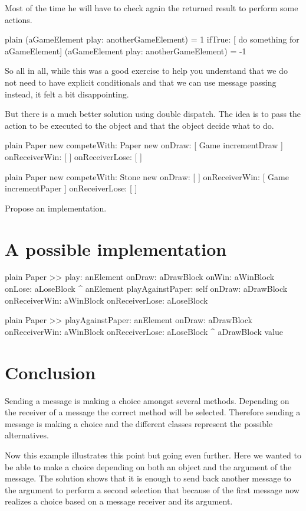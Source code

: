 \documentclass[10pt,twoside,english]{_support/latex/sbabook/sbabook}
\begin{document}
Most of the time he will have to check again the returned result to perform some actions.

\begin{displaycode}{plain}
(aGameElement play: anotherGameElement) = 1 
	ifTrue: [ do something for aGameElement]
	(aGameElement play: anotherGameElement) = -1 
\end{displaycode}

So all in all, while this was a good exercise to help you understand that we do not need to have explicit conditionals and that we can use message passing instead, it felt a bit disappointing. 

But there is a much better solution using double dispatch. The idea is to pass the action to be executed to the object and that the object decide what to do. 

\begin{displaycode}{plain}
Paper new competeWith: Paper new
	onDraw: [ Game incrementDraw ]
	onReceiverWin: [ ]
	onReceiverLose: [ ]
\end{displaycode}

\begin{displaycode}{plain}
Paper new competeWith: Stone new
	onDraw: [ ]
	onReceiverWin: [ Game incrementPaper ]
	onReceiverLose: [ ]
\end{displaycode}

Propose an implementation.
\section{A possible implementation}
\begin{displaycode}{plain}
Paper >> play: anElement onDraw: aDrawBlock onWin: aWinBlock onLose: aLoseBlock
	^ anElement
		playAgainstPaper: self
		onDraw: aDrawBlock
		onReceiverWin: aWinBlock
		onReceiverLose: aLoseBlock
\end{displaycode}

\begin{displaycode}{plain}
Paper >> playAgainstPaper: anElement onDraw: aDrawBlock onReceiverWin: aWinBlock onReceiverLose: aLoseBlock
	^ aDrawBlock value
\end{displaycode}
\section{Conclusion}
Sending a message is making a choice amongst several methods. Depending on the receiver of a message the correct method will be selected. Therefore sending a message is making a choice and the different classes represent the possible alternatives. 

Now this example illustrates this point but going even further. Here we wanted to be able to make a choice depending on both an object and the argument of the message. The solution shows that it is enough to send back another message 
to the argument to perform a second selection that because of the first message now realizes a choice based on a message receiver and its argument. 


\backmatter



\end{document}
